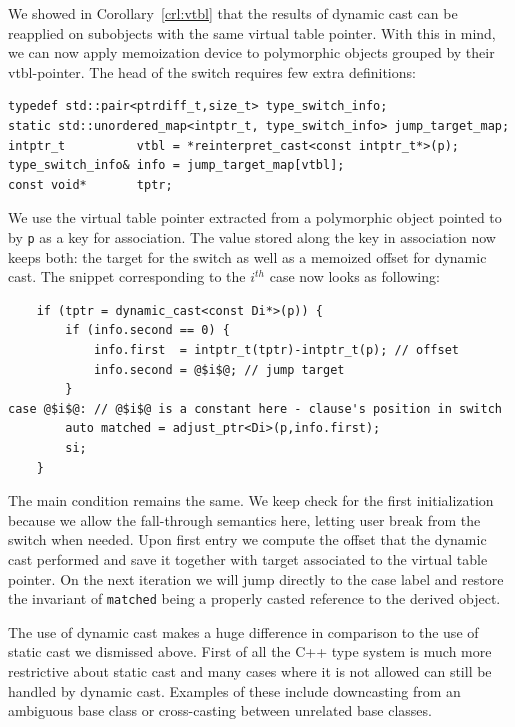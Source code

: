 \documentclass[preprint]{sigplanconf}
\makeatletter
\DeclareRobustCommand{\code}[1]{{\lstinline[breaklines=false,escapechar=@]{#1}}}
\makeatother
\begin{document}
We showed in Corollary~\ref{crl:vtbl} that the results of dynamic cast can be 
reapplied on subobjects with the same virtual table pointer. With this in mind, 
we can now apply memoization device to polymorphic objects grouped by their 
vtbl-pointer. The head of the switch requires few extra definitions:

\begin{lstlisting}
typedef std::pair<ptrdiff_t,size_t> type_switch_info;
static std::unordered_map<intptr_t, type_switch_info> jump_target_map;
intptr_t          vtbl = *reinterpret_cast<const intptr_t*>(p);
type_switch_info& info = jump_target_map[vtbl];
const void*       tptr; 
\end{lstlisting}

\noindent
We use the virtual table pointer extracted from a polymorphic object pointed to 
by \code{p} as a key for association. The value stored along the key in 
association now keeps both: the target for the switch as well as a memoized 
offset for dynamic cast. The snippet corresponding to the $i^{th}$ case now 
looks as following:

\begin{lstlisting}
    if (tptr = dynamic_cast<const Di*>(p)) {
        if (info.second == 0) {
            info.first  = intptr_t(tptr)-intptr_t(p); // offset
            info.second = @$i$@; // jump target
        }
case @$i$@: // @$i$@ is a constant here - clause's position in switch
        auto matched = adjust_ptr<Di>(p,info.first); 
        si;
    }
\end{lstlisting}

\noindent
The main condition remains the same. We keep check for the first initialization 
because we allow the fall-through semantics here, letting user break from the 
switch when needed. Upon first entry we compute the offset that the dynamic cast 
performed and save it together with target associated to the virtual table 
pointer. On the next iteration we will jump directly to the case label and 
restore the invariant of \code{matched} being a properly casted reference to the 
derived object.

The use of dynamic cast makes a huge difference in comparison to the use of 
static cast we dismissed above. First of all the C++ type system is much more 
restrictive about static cast and many cases where it is not allowed can 
still be handled by dynamic cast. Examples of these include downcasting from an 
ambiguous base class or cross-casting between unrelated base classes.
\end{document}
